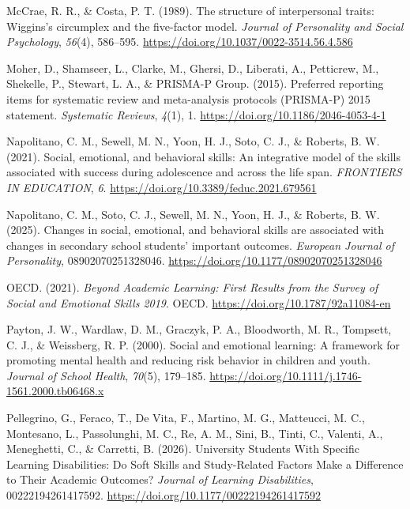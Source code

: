 \documentclass[
  man,
  longtable,
  nolmodern,
  notxfonts,
  notimes,
  colorlinks=true,linkcolor=blue,citecolor=blue,urlcolor=blue]{apa7}
\newlength{\cslhangindent}
\newenvironment{CSLReferences}[2] %
 {\begin{list}{}{%
  \setlength{\itemindent}{0pt}
  \setlength{\leftmargin}{0pt}
  \setlength{\parsep}{0pt}
  \ifodd #1
   \setlength{\leftmargin}{\cslhangindent}
   \setlength{\itemindent}{-1\cslhangindent}
  \fi
  \setlength{\itemsep}{#2\baselineskip}}}
 {\end{list}}
\begin{document}
\begin{CSLReferences}{1}{0}
McCrae, R. R., \& Costa, P. T. (1989). The structure of interpersonal
traits: Wiggins's circumplex and the five-factor model. \emph{Journal of
Personality and Social Psychology}, \emph{56}(4), 586--595.
\url{https://doi.org/10.1037/0022-3514.56.4.586}

Moher, D., Shamseer, L., Clarke, M., Ghersi, D., Liberati, A.,
Petticrew, M., Shekelle, P., Stewart, L. A., \& PRISMA-P Group. (2015).
Preferred reporting items for systematic review and meta-analysis
protocols (PRISMA-P) 2015 statement. \emph{Systematic Reviews},
\emph{4}(1), 1. \url{https://doi.org/10.1186/2046-4053-4-1}

Napolitano, C. M., Sewell, M. N., Yoon, H. J., Soto, C. J., \& Roberts,
B. W. (2021). Social, emotional, and behavioral skills: An integrative
model of the skills associated with success during adolescence and
across the life span. \emph{FRONTIERS IN EDUCATION}, \emph{6}.
\url{https://doi.org/10.3389/feduc.2021.679561}

Napolitano, C. M., Soto, C. J., Sewell, M. N., Yoon, H. J., \& Roberts,
B. W. (2025). Changes in social, emotional, and behavioral skills are
associated with changes in secondary school students{'} important
outcomes. \emph{European Journal of Personality}, 08902070251328046.
\url{https://doi.org/10.1177/08902070251328046}

OECD. (2021). \emph{Beyond Academic Learning: First Results from the
Survey of Social and Emotional Skills 2019}. OECD.
\url{https://doi.org/10.1787/92a11084-en}

Payton, J. W., Wardlaw, D. M., Graczyk, P. A., Bloodworth, M. R.,
Tompsett, C. J., \& Weissberg, R. P. (2000). Social and emotional
learning: A framework for promoting mental health and reducing risk
behavior in children and youth. \emph{Journal of School Health},
\emph{70}(5), 179--185.
\url{https://doi.org/10.1111/j.1746-1561.2000.tb06468.x}

Pellegrino, G., Feraco, T., De Vita, F., Martino, M. G., Matteucci, M.
C., Montesano, L., Passolunghi, M. C., Re, A. M., Sini, B., Tinti, C.,
Valenti, A., Meneghetti, C., \& Carretti, B. (2026). University
{Students With Specific Learning Disabilities}: {Do Soft Skills} and
{Study-Related Factors Make} a {Difference} to {Their Academic
Outcomes}? \emph{Journal of Learning Disabilities}, 00222194261417592.
\url{https://doi.org/10.1177/00222194261417592}


\end{CSLReferences}
\end{document}
